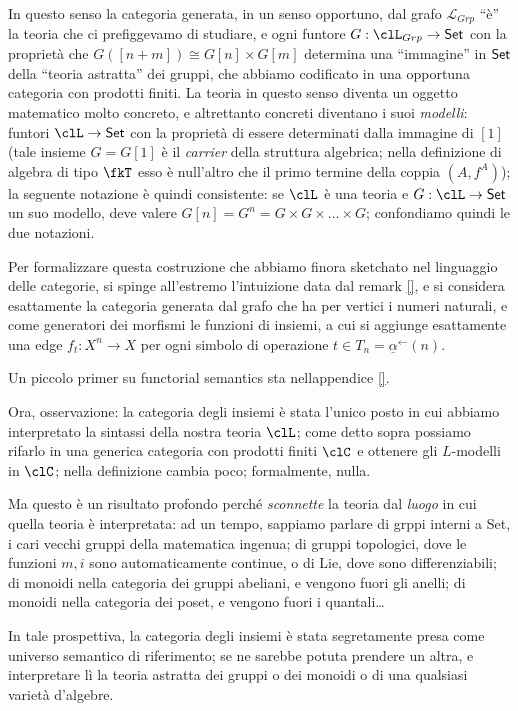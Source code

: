 In questo senso la categoria generata, in un senso opportuno, dal grafo $\mathcal{L}_{Grp}$ ``è'' la teoria che ci prefiggevamo di studiare, e ogni funtore $G: \clL_{Grp} \to \Set$ con la proprietà che $G([n+m]) \cong G[n] \times G[m]$ determina una ``immagine'' in $\mathsf{Set}$ della ``teoria astratta'' dei gruppi, che abbiamo codificato in una opportuna categoria con prodotti finiti. La teoria in questo senso diventa un oggetto matematico molto concreto, e altrettanto concreti diventano i suoi \emph{modelli}: funtori $\clL \to \Set$ con la proprietà di essere determinati dalla immagine di $[1]$ (tale insieme $G=G[1]$ è il \emph{carrier} della struttura algebrica; nella definizione di algebra di tipo $\fkT$ esso è null'altro che il primo termine della coppia $(A,f^A)$);  la seguente notazione è quindi consistente: se $\clL$ è una teoria e $G : \clL \to \Set$ un suo modello, deve valere $G[n]=G^n = G \times G \times\dots\times G$; confondiamo quindi le due notazioni.

Per formalizzare questa costruzione che abbiamo finora sketchato nel linguaggio delle categorie, si spinge all'estremo l'intuizione data dal remark \ref{}, e si considera esattamente la categoria generata dal grafo che ha per vertici i numeri naturali, e come generatori dei morfismi le funzioni di insiemi, a cui si aggiunge esattamente una edge $f_t : X^n \to X$ per ogni simbolo di operazione $t \in T_n = \underline{\alpha}^\leftarrow(n)$.

Un piccolo primer su functorial semantics sta nellappendice \ref{}.

Ora, osservazione: la categoria degli insiemi è stata l'unico posto in cui abbiamo interpretato la sintassi della nostra teoria $\clL$; come detto sopra possiamo rifarlo in una generica categoria con prodotti finiti $\clC$ e ottenere gli $L$-modelli in $\clC$; nella definizione cambia poco; formalmente, nulla.

Ma questo è un risultato profondo perché \emph{sconnette} la teoria dal \emph{luogo} in cui quella teoria è interpretata: ad un tempo, sappiamo parlare di grppi interni a Set, i cari vecchi gruppi della matematica ingenua; di gruppi topologici, dove le funzioni $m,i$ sono automaticamente continue, o di Lie, dove sono differenziabili; di monoidi nella categoria dei gruppi abeliani, e vengono fuori gli anelli;  di monoidi nella categoria dei poset, e vengono fuori i quantali\dots

In tale prospettiva, la categoria degli insiemi è stata segretamente presa come universo semantico di riferimento; se ne sarebbe potuta prendere un altra, e interpretare lì la teoria astratta dei gruppi o dei monoidi o di una qualsiasi varietà d'algebre.

